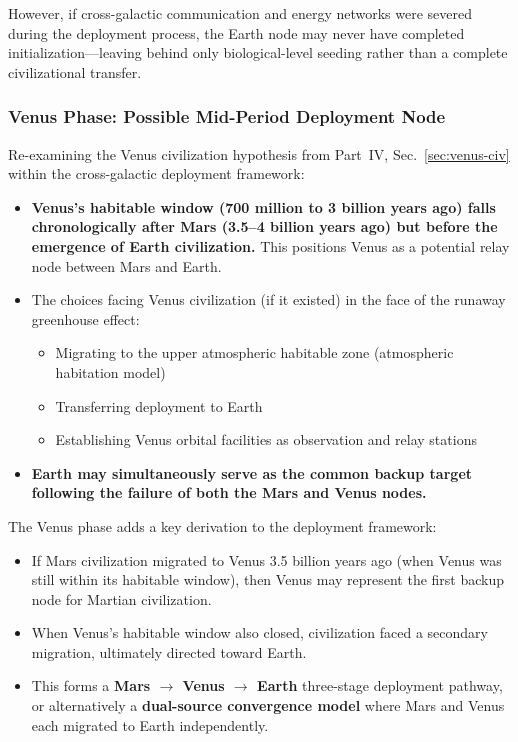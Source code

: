 \documentclass[aps,prd,twocolumn,superscriptaddress,nofootinbib]{revtex4-2}
\begin{document}
However, if cross-galactic communication and energy networks were severed during the deployment process, the Earth node may never have completed initialization---leaving behind only biological-level seeding rather than a complete civilizational transfer.

\subsubsection{Venus Phase: Possible Mid-Period Deployment Node}\label{sec:venus-phase}

Re-examining the Venus civilization hypothesis from Part~IV, Sec.~\ref{sec:venus-civ} within the cross-galactic deployment framework:

\begin{itemize}
  \item \textbf{Venus's habitable window (700 million to 3 billion years ago) falls chronologically after Mars (3.5--4 billion years ago) but before the emergence of Earth civilization.} This positions Venus as a potential relay node between Mars and Earth.
  \item The choices facing Venus civilization (if it existed) in the face of the runaway greenhouse effect:
  \begin{itemize}
    \item Migrating to the upper atmospheric habitable zone (atmospheric habitation model)
    \item Transferring deployment to Earth
    \item Establishing Venus orbital facilities as observation and relay stations
  \end{itemize}
  \item \textbf{Earth may simultaneously serve as the common backup target following the failure of both the Mars and Venus nodes.}
\end{itemize}

The Venus phase adds a key derivation to the deployment framework:

\begin{itemize}
  \item If Mars civilization migrated to Venus 3.5 billion years ago (when Venus was still within its habitable window), then Venus may represent the first backup node for Martian civilization.
  \item When Venus's habitable window also closed, civilization faced a secondary migration, ultimately directed toward Earth.
  \item This forms a \textbf{Mars $\to$ Venus $\to$ Earth} three-stage deployment pathway, or alternatively a \textbf{dual-source convergence model} where Mars and Venus each migrated to Earth independently.
\end{itemize}
\end{document}
